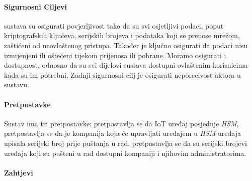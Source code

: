 \documentclass[zavrsnirad]{fer}
\begin{document}
	\paragraph{Sigurnosni Ciljevi}
	
	sustava su osigurati povjerljivost tako da su svi osjetljivi podaci, poput kriptografskih ključeva, serijskih brojeva i podataka koji se prenose mrežom, zaštićeni od neovlaštenog pristupa. Također je ključno osigurati da podaci nisu izmijenjeni ili oštećeni tijekom prijenosa ili pohrane. Moramo osigurati i dostupnost, odnosno da su svi dijelovi sustava dostupni ovlaštenim korisnicima kada su im potrebni. Zadnji sigurnosni cilj je osigurati neporecivost aktora u sustavu.
	
	\paragraph{Pretpostavke}
	Sustav ima tri pretpostavke: pretpostavlja se da IoT uređaj posjeduje \textit{HSM}, pretpostavlja se da je kompanija koja će upravljati uređajem u \textit{HSM} uređaja upisala serijski broj prije puštanja u rad, pretpostavlja se da su serijski brojevi uređaja koji su pušteni u rad dostupni kompaniji i njihovim administratorima.
	
	\paragraph{Zahtjevi}
	
\end{document}
